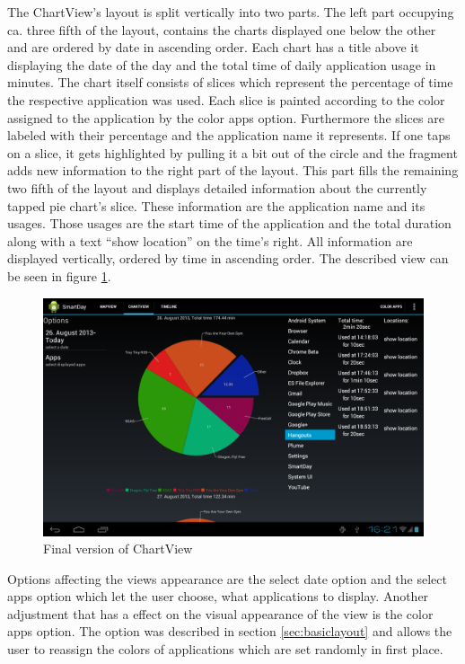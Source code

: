 The  ChartView's layout is split vertically into two parts. The left part occupying ca. three fifth of the layout, contains the charts displayed one below the other and are ordered by date in ascending order. Each chart has a title above it displaying the date of the day and the total time of daily application usage in minutes. The chart itself consists of slices which represent the percentage of time the respective application was used. Each slice is painted according to the color assigned to the application by the color apps option. Furthermore the slices are labeled with their percentage and the application name it represents. If one taps on a slice, it gets highlighted by pulling it a bit out of the circle and the fragment adds new information to the right part of the layout. This part fills the remaining two fifth of the layout and displays detailed information about the currently tapped pie chart's slice. These information  are the application name and its usages. Those usages are the start time of the application and the total duration along with a text ``show location'' on the time's right. All information are displayed vertically, ordered by time in ascending order. The described view can be seen in figure \ref{fig:finalchartview}.
\begin{figure}
	\caption{Final version of ChartView}
	\label{fig:finalchartview}
	\includegraphics[width=\textwidth]{images/Screenshots/vfinal/Screenshot_2013-08-28-16-21-10.png}
\end{figure}


Options  affecting the views appearance are the select date option and the select apps option which let the user choose, what applications to display. Another adjustment that has a effect on the visual appearance of the view is the color apps option. The option was described in section \ref{sec:basiclayout} and allows the user to reassign the colors of applications which are set randomly in first place.

